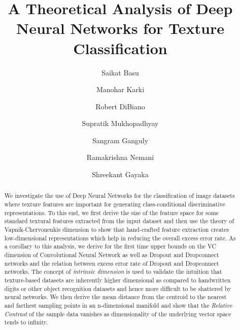 \documentclass[11pt,a4paper]{article}
\begin{document}
\title{A Theoretical Analysis of Deep Neural Networks for Texture Classification}


\author[1]{Saikat Basu}
\author[1]{Manohar Karki}
\author[2]{Robert DiBiano}
\author[1]{Supratik Mukhopadhyay}
\author[3]{Sangram Ganguly}
\author[4]{Ramakrishna Nemani}
\author[5]{Shreekant Gayaka}

\renewcommand\Authands{ and }







\maketitle

\newcommand{\fix}{\marginpar{FIX}}
\newcommand{\new}{\marginpar{NEW}}
\newtheorem{theorem}{Theorem}[section]
\newtheorem{proposition}{Proposition}[section]
\newtheorem{lemma}[theorem]{Lemma}

\begin{abstract}
 We investigate the use of Deep Neural Networks for the classification of image datasets where texture features are important for generating class-conditional discriminative representations. To this end, we first derive the size of the feature space for some standard textural features extracted from the input dataset and then use the theory of Vapnik-Chervonenkis dimension to show that hand-crafted feature extraction creates low-dimensional representations which help in reducing the overall excess error rate. As a corollary to this analysis, we derive for the first time upper bounds on the VC dimension of Convolutional Neural Network as well as Dropout and Dropconnect networks and the relation between excess error rate of Dropout and Dropconnect networks. The concept of \emph{intrinsic dimension} is used to validate the intuition that texture-based datasets are inherently higher dimensional as compared to handwritten digits or other object recognition datasets and hence more difficult to be shattered by neural networks. We then derive the mean distance from the centroid to the nearest and farthest sampling points in an n-dimensional manifold and show that the \emph{Relative Contrast} of the sample data vanishes as dimensionality of the underlying vector space tends to infinity.
\end{abstract}
\end{document}
